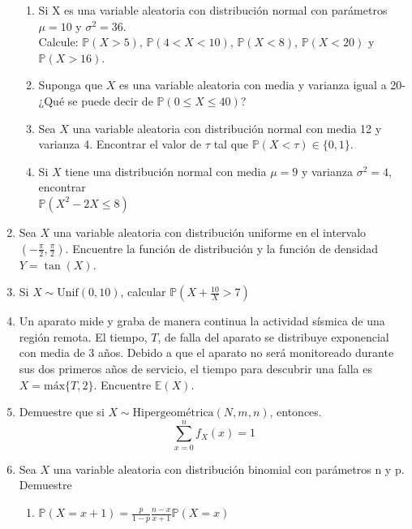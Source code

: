 \documentclass[11pt,a4paper]{report}
\begin{document}
\begin{enumerate}
{\begin{enumerate}
				\item {
					Si X es una variable aleatoria con distribución normal con
                    parámetros $\mu = 10$ y $\sigma^2 = 36$.\\
                    Calcule: $\mathbb{P}(X > 5)$, $\mathbb{P}(4 < X < 10)$,
                    $\mathbb{P}(X < 8)$, $\mathbb{P}(X < 20)$ y
                    $\mathbb{P}(X > 16)$.
				}

				\item {
					Suponga que $X$ es una variable aleatoria con media y
					varianza igual a 20- ¿Qué se puede decir de
					$\mathbb{P}(0 \leq X \leq 40)$?
				}

				\item {
					Sea $X$ una variable aleatoria con distribución normal con
					media 12 y varianza 4. Encontrar el valor de $\tau$ tal que
					$\mathbb{P}(X < \tau) \in \{0,1\}$.
				}

				\item {
					Si $X$ tiene una distribución normal con media $\mu = 9$ y
					varianza $\sigma^2 = 4$, encontrar \\
					$\mathbb{P}(X^2 - 2X \leq 8)$
				}
			\end{enumerate}
		}

		\item{
			Sea $X$ una variable aleatoria con distribución uniforme en el
			intervalo $(-\frac{\pi}{2}, \frac{\pi}{2})$. Encuentre la función de
			distribución y la función de densidad $Y = \tan(X)$.
		}

		\item{
			Si $X \sim \text{Unif}(0, 10)$, calcular
			$\mathbb{P}(X + \frac{10}{X} > 7)$
		}

		\item{
			Un aparato mide y graba de manera continua la actividad sísmica de
			una región remota. El tiempo, $T$, de falla del aparato se
			distribuye exponencial con media de 3 años. Debido a que el aparato
			no será monitoreado durante sus dos primeros años de servicio, el
			tiempo para descubrir una falla es $X = \text{máx}\{T,2\}$.
			Encuentre $\mathbb{E}(X)$.
		}

		\item{
			Demuestre que si $X \sim \text{Hipergeométrica}(N,m,n)$, entonces.
				$$ \sum_{x = 0}^{n}f_X(x) = 1$$
		}

		\item{
			Sea $X$ una variable aleatoria con distribución binomial con
			parámetros n y p. Demuestre
			\begin{enumerate}
				\item {
					$\mathbb{P}(X = x + 1) = \frac{p}{1 - p} \frac{n - x}{x + 1}
					 \mathbb{P}(X = x)$
				}


\end{enumerate}}
\end{enumerate}
\end{document}
